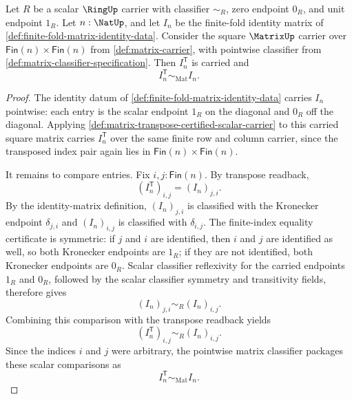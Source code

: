 \begin{theorem}
\label{thm:matrix-transpose-fixes-finite-fold-identity}
Let $R$ be a scalar $\RingUp$ carrier with classifier $\sim_R$, zero endpoint
$0_R$, and unit endpoint $1_R$. Let $n:\NatUp$, and let $I_n$ be the
finite-fold identity matrix of \autoref{def:finite-fold-matrix-identity-data}.
Consider the square $\MatrixUp$ carrier over
$\mathsf{Fin}(n)\times\mathsf{Fin}(n)$ from \autoref{def:matrix-carrier}, with
pointwise classifier from \autoref{def:matrix-classifier-specification}. Then
$I_n^{\mathsf{T}}$ is carried and
$$
I_n^{\mathsf{T}}\sim_{\mathrm{Mat}} I_n.
$$
\end{theorem}
\begin{proof}
The identity datum of \autoref{def:finite-fold-matrix-identity-data} carries
$I_n$ pointwise: each entry is the scalar endpoint $1_R$ on the diagonal and
$0_R$ off the diagonal. Applying
\autoref{def:matrix-transpose-certified-scalar-carrier} to this carried square
matrix carries $I_n^{\mathsf{T}}$ over the same finite row and column carrier,
since the transposed index pair again lies in
$\mathsf{Fin}(n)\times\mathsf{Fin}(n)$.

It remains to compare entries. Fix $i,j:\mathsf{Fin}(n)$. By transpose
readback,
$$
(I_n^{\mathsf{T}})_{i,j}=(I_n)_{j,i}.
$$
By the identity-matrix definition, $(I_n)_{j,i}$ is classified with the
Kronecker endpoint $\delta_{j,i}$ and $(I_n)_{i,j}$ is classified with
$\delta_{i,j}$. The finite-index equality certificate is symmetric: if $j$ and
$i$ are identified, then $i$ and $j$ are identified as well, so both
Kronecker endpoints are $1_R$; if they are not identified, both Kronecker
endpoints are $0_R$. Scalar classifier reflexivity for the carried endpoints
$1_R$ and $0_R$, followed by the scalar classifier symmetry and transitivity
fields, therefore gives
$$
(I_n)_{j,i}\sim_R (I_n)_{i,j}.
$$
Combining this comparison with the transpose readback yields
$$
(I_n^{\mathsf{T}})_{i,j}\sim_R (I_n)_{i,j}.
$$
Since the indices $i$ and $j$ were arbitrary, the pointwise matrix classifier
packages these scalar comparisons as
$$
I_n^{\mathsf{T}}\sim_{\mathrm{Mat}} I_n.
$$
\end{proof}
